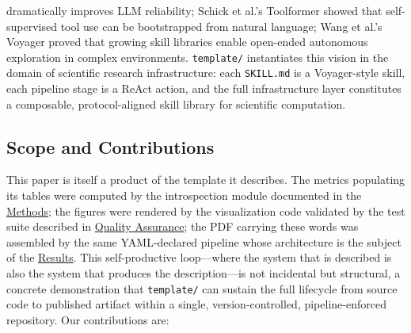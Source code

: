 \documentclass[
]{article}
\begin{document}
\begin{enumerate}
  dramatically improves LLM reliability; Schick et al.'s Toolformer
  \citep{schick2023toolformer} showed that self-supervised tool use can
  be bootstrapped from natural language; Wang et al.'s Voyager
  \citep{wang2023voyager} proved that growing skill libraries enable
  open-ended autonomous exploration in complex environments.
  \texttt{template/} instantiates this vision in the domain of
  scientific research infrastructure: each \texttt{SKILL.md} is a
  Voyager-style skill, each pipeline stage is a ReAct action, and the
  full infrastructure layer constitutes a composable, protocol-aligned
  skill library for scientific computation.
\end{enumerate}

\subsection{Scope and Contributions}\label{scope-and-contributions}

This paper is itself a product of the template it describes. The metrics
populating its tables were computed by the introspection module
documented in the \href{03a_architecture.md\#methods}{Methods}; the
figures were rendered by the visualization code validated by the test
suite described in \href{03e_quality.md\#quality-assurance}{Quality
Assurance}; the PDF carrying these words was assembled by the same
YAML-declared pipeline whose architecture is the subject of the
\href{04_results.md\#results}{Results}. This self-productive
loop---where the system that is described is also the system that
produces the description---is not incidental but structural, a concrete
demonstration that \texttt{template/} can sustain the full lifecycle
from source code to published artifact within a single,
version-controlled, pipeline-enforced repository. Our contributions are:
\end{document}
